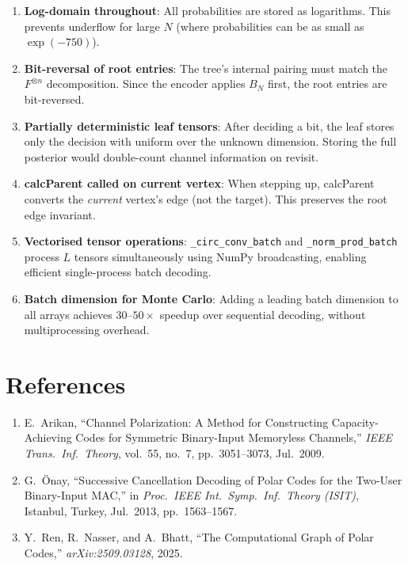 \documentclass[11pt,a4paper]{article}
\begin{document}
\begin{enumerate}
    \item \textbf{Log-domain throughout}: All probabilities are stored as logarithms. This prevents underflow for large $N$ (where probabilities can be as small as $\exp(-750)$).

    \item \textbf{Bit-reversal of root entries}: The tree's internal pairing must match the $F^{\otimes n}$ decomposition. Since the encoder applies $B_N$ first, the root entries are bit-reversed.

    \item \textbf{Partially deterministic leaf tensors}: After deciding a bit, the leaf stores only the decision with uniform over the unknown dimension. Storing the full posterior would double-count channel information on revisit.

    \item \textbf{calcParent called on current vertex}: When stepping up, calcParent converts the \emph{current} vertex's edge (not the target). This preserves the root edge invariant.

    \item \textbf{Vectorised tensor operations}: \texttt{\_circ\_conv\_batch} and \texttt{\_norm\_prod\_batch} process $L$ tensors simultaneously using NumPy broadcasting, enabling efficient single-process batch decoding.

    \item \textbf{Batch dimension for Monte Carlo}: Adding a leading batch dimension to all arrays achieves $30$--$50\times$ speedup over sequential decoding, without multiprocessing overhead.
\end{enumerate}

\section*{References}

\begin{enumerate}
    \item E.~Arikan, ``Channel Polarization: A Method for Constructing Capacity-Achieving Codes for Symmetric Binary-Input Memoryless Channels,'' \textit{IEEE Trans.\ Inf.\ Theory}, vol.~55, no.~7, pp.~3051--3073, Jul.~2009.

    \item G.~\"Onay, ``Successive Cancellation Decoding of Polar Codes for the Two-User Binary-Input MAC,'' in \textit{Proc.\ IEEE Int.\ Symp.\ Inf.\ Theory (ISIT)}, Istanbul, Turkey, Jul.~2013, pp.~1563--1567.

    \item Y.~Ren, R.~Nasser, and A.~Bhatt, ``The Computational Graph of Polar Codes,'' \textit{arXiv:2509.03128}, 2025.
\end{enumerate}
\end{document}
